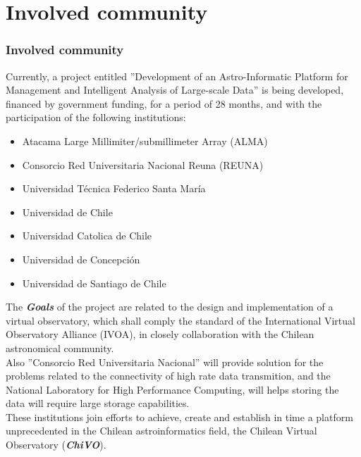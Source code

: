 \section{Involved community}

\begin{frame}
\frametitle{Involved community}
Currently, a project entitled ”Development of an Astro-Informatic Platform for Management and
Intelligent Analysis of Large-scale Data” is being developed, financed by government funding, for a period of 28 months, 
and with the participation of the following institutions:
\begin{itemize}
	\addtolength{\itemindent}{1cm}
	\item Atacama Large Millimiter/submillimeter Array (ALMA)
	\item Consorcio Red Universitaria Nacional Reuna (REUNA)
	\item Universidad Técnica Federico Santa María
	\item Universidad de Chile
	\item Universidad Catolica de Chile
	\item Universidad de Concepción
	\item Universidad de Santiago de Chile
\end{itemize}
\end{frame}

\begin{frame}

The \emph{\textbf{Goals}} of the project are related to the design and implementation of a virtual observatory, which
shall comply the standard of the International Virtual Observatory Alliance (IVOA), in closely collaboration with the
Chilean astronomical community.\\
\vspace{0.7cm}
Also ”Consorcio Red Universitaria Nacional” will provide solution for the problems related to the connectivity of high
rate data transmition, and the National Laboratory for High Performance Computing, will helps storing the data will require large storage
capabilities.\\
\vspace{0.7cm}
These institutions join efforts to achieve, create and establish in time a platform unprecedented in the
Chilean astroinformatics field, the Chilean Virtual Observatory (\emph{\textbf{ChiVO}}).
\end{frame}
